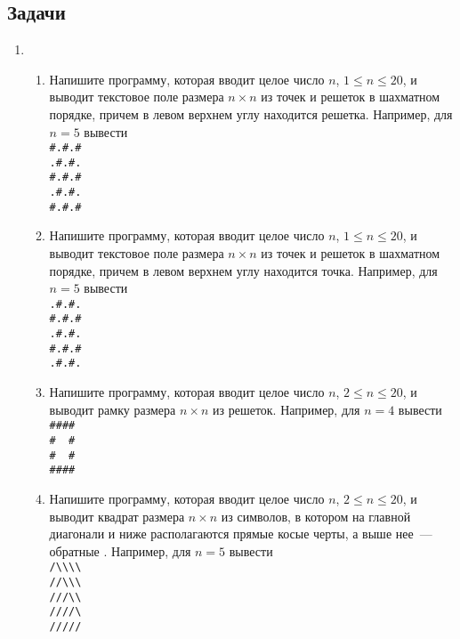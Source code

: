 \documentclass{article}
\begin{document}
\subsection*{Задачи}
\begin{enumerate}[label={}, leftmargin=0pt, itemindent=0pt]
\item
\begin{enumerate}[label=\arabic{enumi}.\arabic*.]
\item
Напишите программу, которая вводит целое число $n$, $1\leqslant n \leqslant 20$, и выводит текстовое поле размера $n\times n$ из точек и решеток в шахматном порядке, причем в левом верхнем углу находится решетка.
Например, для $n=5$ вывести\\
\verb!#.#.#!\\
\verb!.#.#.!\\
\verb!#.#.#!\\
\verb!.#.#.!\\
\verb!#.#.#!
\item 
Напишите программу, которая вводит целое число $n$, $1\leqslant n \leqslant 20$, и выводит текстовое поле размера $n\times n$ из точек и решеток в шахматном порядке, причем в левом верхнем углу находится точка.
Например, для $n=5$ вывести\\
\verb!.#.#.!\\
\verb!#.#.#!\\
\verb!.#.#.!\\
\verb!#.#.#!\\
\verb!.#.#.!
\item 
Напишите программу, которая вводит целое число $n$, $2\leqslant n \leqslant 20$, и выводит рамку размера $n\times n$ из решеток. Например, для $n=4$ вывести\\
\verb!#### !\\
\verb!#  # !\\
\verb!#  # !\\
\verb!#### !
\item 
Напишите программу, которая вводит целое число $n$, $2\leqslant n \leqslant 20$, и выводит квадрат размера $n\times n$ из символов, в котором на главной диагонали и ниже
располагаются прямые косые черты, а выше нее~— обратные . Например, для $n=5$ вывести
\\
\verb!/\\\\!\\
\verb!//\\\!\\
\verb!///\\!\\
\verb!////\!\\
\verb!/////!\\
\end{enumerate}
\hrulefill


\end{enumerate}
\end{document}
